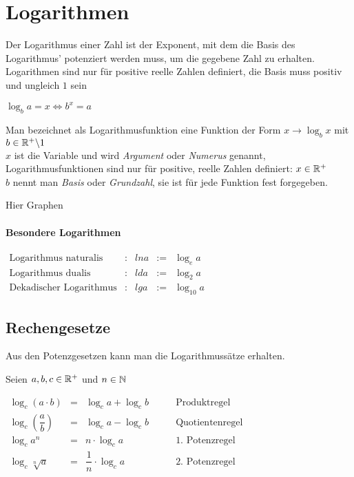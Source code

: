 \documentclass[main.tex]{subfiles}
\begin{document}
\chapter{Logarithmen}

\begin{Definition}
Der Logarithmus einer Zahl ist der Exponent, mit dem die Basis des Logarithmus' potenziert werden muss, um die gegebene Zahl zu erhalten. Logarithmen sind nur für positive reelle Zahlen definiert, die Basis muss positiv und ungleich $1$  sein
\begin{center}
$\log_ba=x\Leftrightarrow b^x=a$
\end{center}
\end{Definition}

\begin{Definition}
Man bezeichnet als Logarithmusfunktion eine Funktion der Form $x\rightarrow \log_bx$ mit $b\in \mathbb{R}^+\backslash 1$\\
$x$ ist die Variable und wird \textit{Argument} oder \textit{Numerus} genannt, Logarithmusfunktionen sind nur für positive, reelle Zahlen definiert: $x\in\mathbb{R}^+$\\
$b$ nennt man \textit{Basis} oder \textit{Grundzahl}, sie ist für jede Funktion fest forgegeben.\\
\end{Definition}

Hier Graphen
\subsubsection{Besondere Logarithmen}

$\begin{array}{lcccl}
\mbox{Logarithmus naturalis}&:&ln a&:=&\log_ea\\
\mbox{Logarithmus dualis}&:&ld a&:=&\log_2a\\
\mbox{Dekadischer Logarithmus}&:&lg a&:=&\log_{10}a
\end{array}$
\\
	
			\section{Rechengesetze}

Aus den Potenzgesetzen kann man die Logarithmussätze erhalten.

\begin{Theorem}
Seien $a,b,c\in\mathbb{R}^+$ und $n\in\mathbb{N}$\\
\begin{center}
$\begin{array}{cccl}
\log_c(a\cdot b)&=&\log_ca+\log_cb&\qquad\mbox {Produktregel}\\
\log_c\left(\dfrac{a}{b}\right)&=&\log_ca-\log_cb&\qquad\mbox{Quotientenregel}\\
\log_ca^n&=&n\cdot\log_ca&\qquad\mbox{1. Potenzregel}\\
\log_c\sqrt[n]{a}&=&\dfrac{1}{n}\cdot\log_ca&\qquad\mbox{2. Potenzregel}\\
\end{array}$
\end{center}
\end{Theorem}
\end{document}
